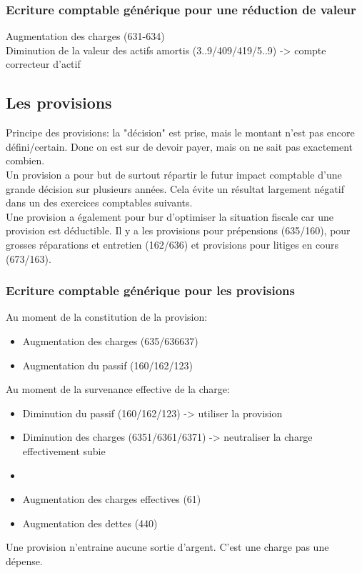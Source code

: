 \documentclass{article}
\begin{document}
\subsubsection*{Ecriture comptable générique pour une réduction de valeur}
Augmentation des charges (631-634)\\
Diminution de la valeur des actifs amortis (3..9/409/419/5..9) -> compte correcteur d'actif

\subsection{Les provisions}
Principe des provisions: la "décision" est prise, mais le montant n'est pas encore défini/certain. Donc on est sur de devoir payer, mais on ne sait pas exactement combien. \\
Un provision a pour but de surtout répartir le futur impact comptable d'une grande décision sur plusieurs années. Cela évite un résultat largement négatif dans un des exercices comptables suivants. \\
Une provision a également pour bur d'optimiser la situation fiscale car une provision est déductible.
Il y a les provisions pour prépensions (635/160), pour grosses réparations et entretien (162/636) et provisions pour litiges en cours (673/163). \\
\subsubsection*{Ecriture comptable générique pour les provisions}
Au moment de la constitution de la provision:
\begin{itemize}
    \item Augmentation des charges (635/636637)
    \item Augmentation du passif (160/162/123)
\end{itemize}
Au moment de la survenance effective de la charge:
\begin{itemize}
    \item Diminution du passif (160/162/123) -> utiliser la provision
    \item Diminution des charges (6351/6361/6371) -> neutraliser la charge effectivement subie
    \item
    \item Augmentation des charges effectives (61)
    \item Augmentation des dettes (440)
\end{itemize}
Une provision n'entraine aucune sortie d'argent. C'est une charge pas une dépense. \\
\end{document}

